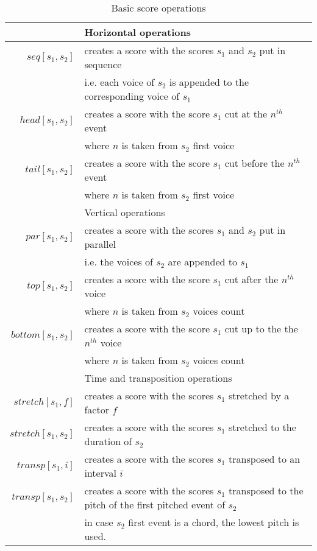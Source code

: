 \documentclass[10pt,a4paper,frenchb]{article}
\begin{document}
\begin{table}[h]
\begin{center}
\begin{tabular}{rl}
\hline
& Horizontal operations \\
\hline
$seq[s_1,s_2]$ & creates a score with the scores $s_1 $ and $s_2 $ put in sequence \\
               & i.e. each voice of $s_2$ is appended to the corresponding voice of $s_1$ \\
$head[s_1, s_2]$ & creates a score with the score $s_1 $ cut at the $n^{th}$ event \\
			 & where $n$ is taken from $s_2$ first voice \\
$tail[s_1, s_2]$ & creates a score with the score $s_1 $ cut before the $n^{th}$ event \\
			 & where $n$ is taken from $s_2$ first voice \\
\hline
& Vertical operations \\
\hline
$par[s_1, s_2]$ & creates a score with the scores $s_1 $ and $s_2 $ put in parallel \\
               & i.e. the voices of $s_2$ are appended to $s_1$ \\
$top[s_1, s_2]$ & creates a score with the score $s_1 $ cut after the $n^{th}$ voice \\
			 & where $n$ is taken from $s_2$ voices count \\
$bottom[s_1, s_2]$ & creates a score with the score $s_1 $ cut up to the the $n^{th}$ voice \\
			 & where $n$ is taken from $s_2$ voices count \\
\hline
& Time and transposition operations \\
\hline
$stretch[s_1, f]$ & creates a score with the scores $s_1$ stretched by a factor $f$ \\
$stretch[s_1, s_2]$ & creates a score with the scores $s_1$ stretched to the duration of $s_2$ \\
$transp[s_1,i]$ & creates a score with the scores $s_1$ transposed to an interval $i$ \\
$transp[s_1, s_2]$ & creates a score with the scores $s_1$ transposed to the pitch of the first pitched event of $s_2$ \\
			& in case $s_2$ first event is a chord, the lowest pitch is used.\\
\hline
\end{tabular}
\end{center}
\vspace{-4mm}
\caption{Basic score operations}
\label{basicop}
\end{table}
\end{document}
